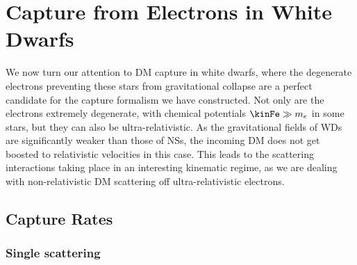 \section{Capture from Electrons in White Dwarfs}
\label{ch4:sec:capture_WDs}

We now turn our attention to DM capture in white dwarfs, where the degenerate electrons preventing these stars from gravitational collapse are a perfect candidate for the capture formalism we have constructed. Not only are the electrons extremely degenerate, with chemical potentials $\kinFe \gg m_e$ in some stars, but they can also be ultra-relativistic. As the gravitational fields of WDs are significantly weaker than those of NSs, the incoming DM does not get boosted to relativistic velocities in this case. This leads to the scattering interactions taking place in an interesting kinematic regime, as we are dealing with non-relativistic DM scattering off ultra-relativistic electrons.


\subsection{Capture Rates}
\label{ch4:subsec:capture_rates_WD}

\subsubsection{Single scattering}
\label{ch4:subsubsec:single_scatter_e}

